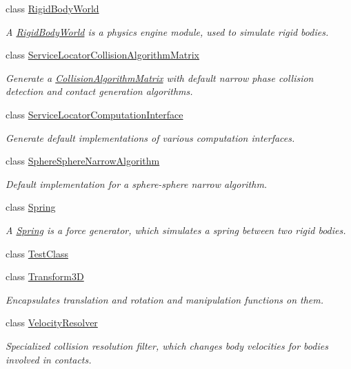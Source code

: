 \begin{DoxyCompactItemize}
class \mbox{\hyperlink{classr3_1_1_rigid_body_world}{Rigid\+Body\+World}}
\begin{DoxyCompactList}\small\item\em A \mbox{\hyperlink{classr3_1_1_rigid_body_world}{Rigid\+Body\+World}} is a physics engine module, used to simulate rigid bodies. \end{DoxyCompactList}\item 
class \mbox{\hyperlink{classr3_1_1_service_locator_collision_algorithm_matrix}{Service\+Locator\+Collision\+Algorithm\+Matrix}}
\begin{DoxyCompactList}\small\item\em Generate a \mbox{\hyperlink{classr3_1_1_collision_algorithm_matrix}{Collision\+Algorithm\+Matrix}} with default narrow phase collision detection and contact generation algorithms. \end{DoxyCompactList}\item 
class \mbox{\hyperlink{classr3_1_1_service_locator_computation_interface}{Service\+Locator\+Computation\+Interface}}
\begin{DoxyCompactList}\small\item\em Generate default implementations of various computation interfaces. \end{DoxyCompactList}\item 
class \mbox{\hyperlink{classr3_1_1_sphere_sphere_narrow_algorithm}{Sphere\+Sphere\+Narrow\+Algorithm}}
\begin{DoxyCompactList}\small\item\em Default implementation for a sphere-\/sphere narrow algorithm. \end{DoxyCompactList}\item 
class \mbox{\hyperlink{classr3_1_1_spring}{Spring}}
\begin{DoxyCompactList}\small\item\em A \mbox{\hyperlink{classr3_1_1_spring}{Spring}} is a force generator, which simulates a spring between two rigid bodies. \end{DoxyCompactList}\item 
class \mbox{\hyperlink{classr3_1_1_test_class}{Test\+Class}}
\item 
class \mbox{\hyperlink{classr3_1_1_transform3_d}{Transform3D}}
\begin{DoxyCompactList}\small\item\em Encapsulates translation and rotation and manipulation functions on them. \end{DoxyCompactList}\item 
class \mbox{\hyperlink{classr3_1_1_velocity_resolver}{Velocity\+Resolver}}
\begin{DoxyCompactList}\small\item\em Specialized collision resolution filter, which changes body velocities for bodies involved in contacts. \end{DoxyCompactList}\end{DoxyCompactItemize}
